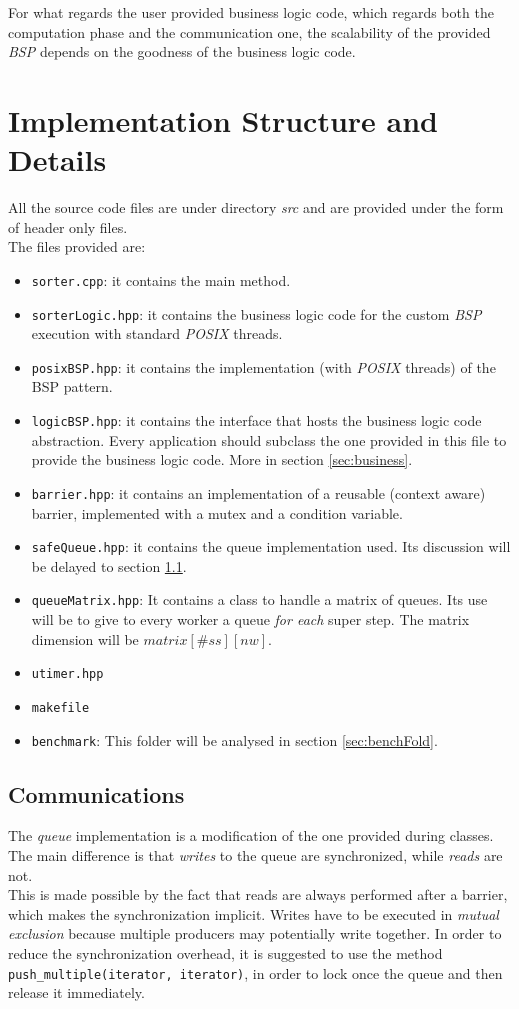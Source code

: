 \documentclass[]{article}
\def\code#1{\texttt{#1}}
\begin{document}
For what regards the user provided business logic code, which regards both the computation phase and the communication one, the scalability of the provided \emph{BSP} depends on the goodness of the business logic code.

\section{Implementation Structure and Details}
\label{sec:implDetails}

All the source code files are under directory \emph{src} and are provided under the form of header only files. \\The files provided are:
\begin{itemize}
	\item \code{sorter.cpp}: it contains the main method. 
	\item \code{sorterLogic.hpp}: it contains the business logic code for the custom \emph{BSP} execution with standard \emph{POSIX} threads.
	\item \code{posixBSP.hpp}: it contains the implementation (with \emph{POSIX} threads) of the BSP pattern.
	\item \code{logicBSP.hpp}: it contains the interface that hosts the business logic code abstraction. Every application should subclass the one provided in this file to provide the business logic code. More in section \ref{sec:business}.
	\item \code{barrier.hpp}: it contains an implementation of a reusable (context aware) barrier, implemented with a mutex and a condition variable.
	\item \code{safeQueue.hpp}: it contains the queue implementation used. Its discussion will be delayed to section \ref{sec:queue}.
	\item \code{queueMatrix.hpp}: It contains a class to handle a matrix of queues. Its use will be to give to every worker a queue \emph{for each} super step. The matrix dimension will be $matrix[\#\mathit{ss}][\mathit{nw}]$.
	\item \code{utimer.hpp}
	\item \code{makefile}
	\item \code{benchmark}: This folder will be analysed in section \ref{sec:benchFold}.
\end{itemize}

\subsection{Communications}
\label{sec:queue}
The \emph{queue} implementation is a modification of the one provided during classes. The main difference is that \emph{writes} to the queue are synchronized, while \emph{reads} are not. \\ This is made possible by the fact that reads are always performed after a barrier, which makes the synchronization implicit. Writes have to be executed in \emph{mutual exclusion} because multiple producers may potentially write together. In order to reduce the synchronization overhead, it is suggested to use the method \code{push\_multiple(iterator, iterator)}, in order to lock once the queue and then release it immediately.
\end{document}
